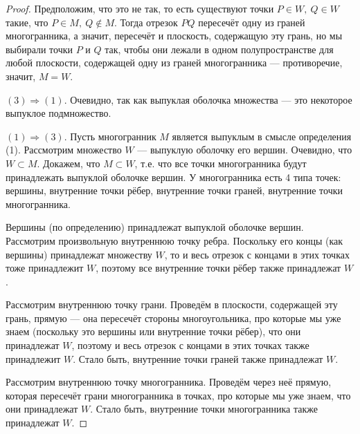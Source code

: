 \begin{proof}
    Предположим, что это не так, то есть существуют точки $P \in W, \ Q \in W$ такие, что $P \in M, \ Q \notin M$. Тогда отрезок $PQ$ пересечёт одну из граней многогранника, а значит, пересечёт и плоскость, содержащую эту грань, но мы выбирали точки $P$ и $Q$ так, чтобы они лежали в одном полупространстве для любой плоскости, содержащей одну из граней многогранника — противоречие, значит, $M = W$.

    $(3) \Longrightarrow (1)$. Очевидно, так как выпуклая оболочка множества — это некоторое выпуклое подмножество.

    $(1) \Longrightarrow (3)$. Пусть многогранник $M$ является выпуклым в смысле определения (1). Рассмотрим множество $W$ — выпуклую оболочку его вершин. Очевидно, что $W \subset M$. Докажем, что $M \subset W$, т.е. что все точки многогранника будут принадлежать выпуклой оболочке вершин. У многогранника есть 4 типа точек: вершины, внутренние точки рёбер, внутренние точки граней, внутренние точки многогранника.

    Вершины (по определению) принадлежат выпуклой оболочке вершин. Рассмотрим произвольную внутреннюю точку ребра. Поскольку его концы (как вершины) принадлежат множеству $W$, то и весь отрезок с концами в этих точках тоже принадлежит $W$, поэтому все внутренние точки рёбер также принадлежат $W$.

    Рассмотрим внутреннюю точку грани. Проведём в плоскости, содержащей эту грань, прямую — она пересечёт стороны многоугольника, про которые мы уже знаем (поскольку это вершины или внутренние точки рёбер), что они принадлежат $W$, поэтому и весь отрезок с концами в этих точках также принадлежит $W$. Стало быть, внутренние точки граней также принадлежат $W$.

    Рассмотрим внутреннюю точку многогранника. Проведём через неё прямую, которая пересечёт грани многогранника в точках, про которые мы уже знаем, что они принадлежат $W$. Стало быть, внутренние точки многогранника также принадлежат $W$.
\end{proof}